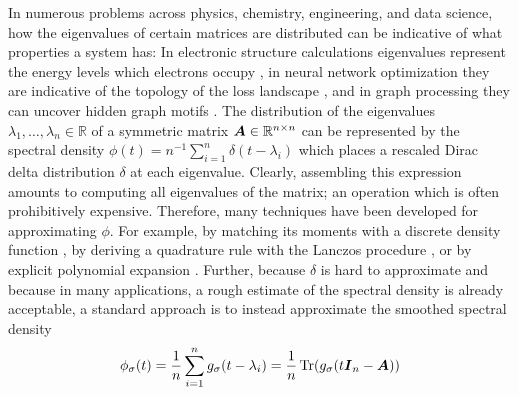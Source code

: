 \documentclass[12pt]{article}
\begin{document}
In numerous problems across physics, chemistry, engineering, and data science, how the eigenvalues of certain matrices are distributed can be indicative of what properties a system has: In electronic structure calculations eigenvalues represent the energy levels which electrons occupy \cite{lin-2017-randomized-estimation, drabold-1993-maximum-entropy, ducastelle-1970-moments-developments, haydock-1972-electronic-structure}, in neural network optimization they are indicative of the topology of the loss landscape \cite{yao-2020-pyhessian-neural, ghorbani-2019-investigation-neural}, and in graph processing they can uncover hidden graph motifs \cite{huang-2021-density-states}. The distribution of the eigenvalues $\lambda_1, \dots, \lambda_n \in \mathbb{R}$ of a symmetric matrix $\boldsymbol{A} \in \mathbb{R}^{n \times n}$ can be represented by the spectral density $\phi(t) = n^{-1} \sum_{i=1}^{n} \delta(t - \lambda_i)$ which places a rescaled Dirac delta distribution $\delta$ at each eigenvalue. Clearly, assembling this expression amounts to computing all eigenvalues of the matrix; an operation which is often prohibitively expensive. Therefore, many techniques have been developed for approximating $\phi$. For example, by matching its moments with a discrete density function \cite{cohen-steiner-2018-approximating-spectrum, braverman-2022-sublinear-time}, by deriving a quadrature rule with the Lanczos procedure \cite{lin-2016-approximating-spectral, chen-2021-analysis-stochastic}, or by explicit polynomial expansion \cite{weisse-2006-kernel-polynomial, lin-2016-approximating-spectral}. Further, because $\delta$ is hard to approximate and because in many applications, a rough estimate of the spectral density is already acceptable, a standard approach is to instead approximate the smoothed spectral density
\begin{equation}
    \phi_{\sigma}(t) = \frac{1}{n} \sum_{i=1}^{n} g_{\sigma}(t - \lambda_i) = \frac{1}{n} \operatorname{Tr}(g_{\sigma}(t \boldsymbol{I}_n - \boldsymbol{A}))
    \label{equ:smoothed-spectral-density}
\end{equation}
\end{document}
